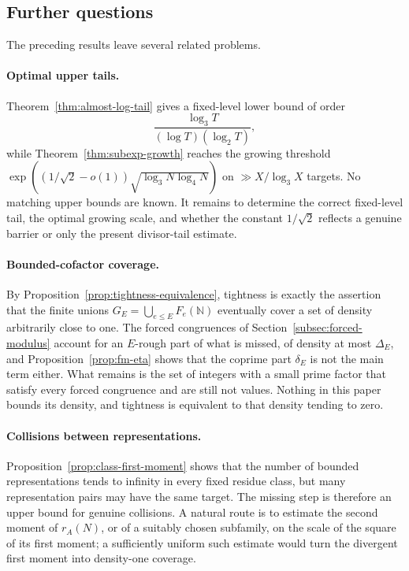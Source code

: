 \documentclass[11pt]{article}
\theoremstyle{remark}
\newcommand{\N}{\mathbb N}
\newcommand{\1}{\mathbf 1}
\begin{document}
\subsection{Further questions}

The preceding results leave several related problems.

\paragraph{Optimal upper tails.}
Theorem~\ref{thm:almost-log-tail} gives a fixed-level lower bound of order
\[
 \frac{\log_3T}{(\log T)(\log_2T)},
\]
while Theorem~\ref{thm:subexp-growth} reaches the growing threshold
$\exp((1/\sqrt2-o(1))\sqrt{\log_3N\log_4N})$ on
$\gg X/\log_3X$ targets.  No matching upper bounds are known.  It remains to
determine the correct fixed-level tail, the optimal growing scale, and
whether the constant $1/\sqrt2$ reflects a genuine barrier or only the
present divisor-tail estimate.

\paragraph{Bounded-cofactor coverage.}
By Proposition~\ref{prop:tightness-equivalence}, tightness is exactly the
assertion that the finite unions $G_E=\bigcup_{e\leq E}F_e(\N)$ eventually
cover a set of density arbitrarily close to one.  The forced congruences of
Section~\ref{subsec:forced-modulus} account for an $E$-rough part of what
is missed, of density at most $\Delta_E$, and Proposition~\ref{prop:fm-eta}
shows that the coprime part $\delta_E$ is not the main term either.  What
remains is the set of integers with a small prime factor that satisfy every
forced congruence and are still not values.  Nothing in this paper bounds
its density, and tightness is equivalent to that density tending to zero.

\paragraph{Collisions between representations.}
Proposition~\ref{prop:class-first-moment} shows that the number of bounded
representations tends to infinity in every fixed residue class, but many
representation pairs may have the same target.  The missing step is therefore
an upper bound for genuine collisions.  A natural route is to estimate the
second moment of $r_A(N)$, or of a suitably chosen subfamily, on the scale of
the square of its first moment; a sufficiently uniform such estimate would
turn the divergent first moment into density-one coverage.
\end{document}
